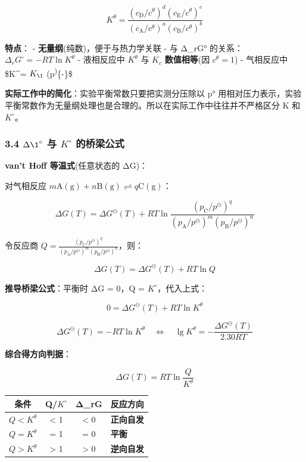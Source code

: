 \documentclass[a4paper,11pt]{ctexart}
\newcounter{none}
\begin{document}
\[
K^\theta = \frac{(c_\mathrm{D}/c^\theta)^d(c_\mathrm{E}/c^\theta)^e}{(c_\mathrm{A}/c^\theta)^a(c_\mathrm{B}/c^\theta)^b}
\]

\textbf{特点}：
- \textbf{无量纲}(纯数)，便于与热力学关联
- 与 Δ\_rG° 的关系：\(\Delta_rG^\circ = -RT\ln K^\theta\)
- 液相反应中 \(K^\theta\) 与 \(K_c\) \textbf{数值相等}(因 \(c^\theta = 1\))
- 气相反应中 \$K\^{}\theta = \(K_{\1}\) \cdot (p\textsuperscript{\theta)}\{-\Delta\nu\}\$

\textbf{实际工作中的简化}：实验平衡常数只要把实测分压除以 p° 用相对压力表示，实验平衡常数作为无量纲处理也是合理的。所以在实际工作中往往并不严格区分 K 和 \(K^{\circ}\)。

\subsubsection{\texorpdfstring{3.4 \(\Delta \1^{\circ}\) 与 \(K^{\circ}\) 的桥梁公式}{3.4 \textbackslash Delta \textbackslash1\^{}\{\textbackslash circ\} 与 K\^{}\{\textbackslash circ\} 的桥梁公式}}\label{delta-1circ-ux4e0e-kcirc-ux7684ux6865ux6881ux516cux5f0f}

\textbf{van't Hoff 等温式}(任意状态的 ΔG)：

对气相反应 \(m\mathrm{A(g)} + n\mathrm{B(g)} \rightleftharpoons q\mathrm{C(g)}\)：

\[
\Delta G(T) = \Delta G^\ominus(T) + RT\ln\frac{(p_\mathrm{C}/p^\ominus)^q}{(p_\mathrm{A}/p^\ominus)^m(p_\mathrm{B}/p^\ominus)^n}
\]

令反应商 \(Q = \frac{(p_\mathrm{C}/p^\ominus)^q}{(p_\mathrm{A}/p^\ominus)^m(p_\mathrm{B}/p^\ominus)^n}\)，则：

\[
\boxed{\Delta G(T) = \Delta G^\ominus(T) + RT\ln Q}
\]

\textbf{推导桥梁公式}：平衡时 ΔG = 0，Q = \(K^{\circ}\)，代入上式：

\[
0 = \Delta G^\ominus(T) + RT\ln K^\theta
\]

\[
\boxed{\Delta G^\ominus(T) = -RT\ln K^\theta \quad \Longleftrightarrow \quad \lg K^\theta = -\frac{\Delta G^\ominus(T)}{2.30RT}}
\]

\textbf{综合得方向判据}：

\[
\Delta G(T) = RT\ln\frac{Q}{K^\theta}
\]

{\def\LTcaptype{none} %
\begin{longtable}[]{@{}cccl@{}}
\toprule\noalign{}
条件 & Q/\(K^{\circ}\) & Δ\_rG & 反应方向 \\
\midrule\noalign{}
\endhead
\bottomrule\noalign{}
\endlastfoot
\(Q < K^\theta\) & \textless{} 1 & \textless{} 0 & \textbf{正向自发} \\
\(Q = K^\theta\) & = 1 & = 0 & \textbf{平衡} \\
\(Q > K^\theta\) & \textgreater{} 1 & \textgreater{} 0 & \textbf{逆向自发} \\
\end{longtable}
}
\end{document}
